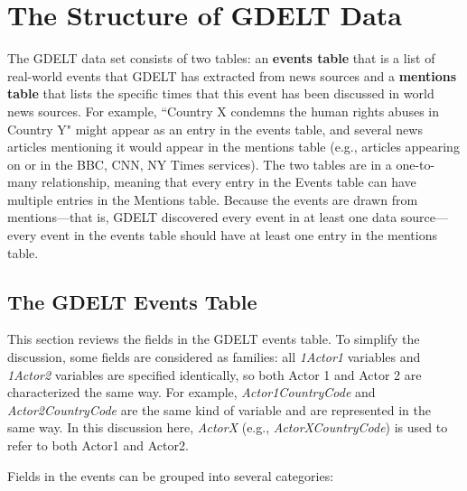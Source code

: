 
\chapter{The Structure of GDELT Data} \label{chap:GDELTData}

\par The GDELT data set consists of two tables: an \textbf{events table} that is a list of real-world events that GDELT has extracted from news sources and a \textbf{mentions table} that lists the specific times that this event has been discussed in world news sources. For example, ``Country X condemns the human rights abuses in Country Y" might appear as an entry in the events table, and several news articles mentioning it would appear in the mentions table (e.g., articles appearing on or in the BBC, CNN, NY Times services). The two tables are in a one-to-many relationship, meaning that every entry in the Events table can have multiple entries in the Mentions table. Because the events are drawn from mentions---that is, GDELT discovered every event in at least one data source---every event in the events table should have at least one entry in the mentions table.

\section{The GDELT Events Table}

\par This section reviews the fields in the GDELT events table. To simplify the discussion, some fields are considered as families:  all \emph{1Actor1} variables and \emph{1Actor2} variables are specified identically, so both Actor 1 and Actor 2 are characterized the same way. For example, \textit{Actor1CountryCode} and \textit{Actor2CountryCode} are the same kind of variable and are represented in the same way. In this discussion here, \emph{ActorX} (e.g., \textit{ActorXCountryCode}) is used to refer to both Actor1 and Actor2.

\par Fields in the events can be grouped into several categories:

